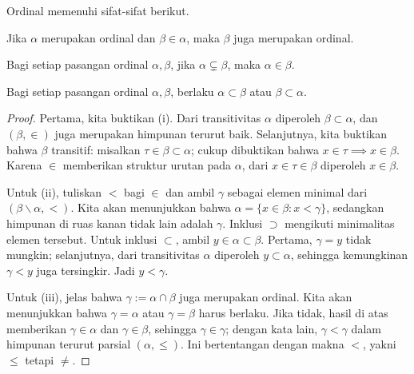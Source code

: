\begin{lemma}\label{prop:ordinal-property}
	Ordinal memenuhi sifat-sifat berikut.
	\begin{compactenum}[(i)]
		\item Jika $\alpha$ merupakan ordinal dan $\beta \in \alpha$, maka $\beta$ juga merupakan ordinal.
		\item Bagi setiap pasangan ordinal $\alpha, \beta$, jika $\alpha \subsetneq \beta$, maka $\alpha \in \beta$.
		\item Bagi setiap pasangan ordinal $\alpha, \beta$, berlaku $\alpha \subset \beta$ atau $\beta \subset \alpha$.
	\end{compactenum}
\end{lemma}
\begin{proof}
	Pertama, kita buktikan (i). Dari transitivitas $\alpha$ diperoleh $\beta \subset \alpha$, dan $(\beta, \in)$ juga merupakan himpunan terurut baik. Selanjutnya, kita buktikan bahwa $\beta$ transitif: misalkan $\tau \in \beta \subset \alpha$; cukup dibuktikan bahwa $x \in \tau \implies x \in \beta$. Karena $\in$ memberikan struktur urutan pada $\alpha$, dari $x \in \tau \in \beta$ diperoleh $x \in \beta$.

	Untuk (ii), tuliskan $<$ bagi $\in$ dan ambil $\gamma$ sebagai elemen minimal dari $(\beta \smallsetminus \alpha, <)$. Kita akan menunjukkan bahwa $\alpha = \{x \in \beta : x < \gamma \}$, sedangkan himpunan di ruas kanan tidak lain adalah $\gamma$. Inklusi $\supset$ mengikuti minimalitas elemen tersebut. Untuk inklusi $\subset$, ambil $y \in \alpha \subset \beta$. Pertama, $\gamma = y$ tidak mungkin; selanjutnya, dari transitivitas $\alpha$ diperoleh $y \subset \alpha$, sehingga kemungkinan $\gamma < y$ juga tersingkir. Jadi $y < \gamma$.

	Untuk (iii), jelas bahwa $\gamma := \alpha \cap \beta$ juga merupakan ordinal. Kita akan menunjukkan bahwa $\gamma = \alpha$ atau $\gamma = \beta$ harus berlaku. Jika tidak, hasil di atas memberikan $\gamma \in \alpha$ dan $\gamma \in \beta$, sehingga $\gamma \in \gamma$; dengan kata lain, $\gamma < \gamma$ dalam himpunan terurut parsial $(\alpha, \leq)$. Ini bertentangan dengan makna $<$, yakni $\leq$ tetapi $\neq$.
\end{proof}

